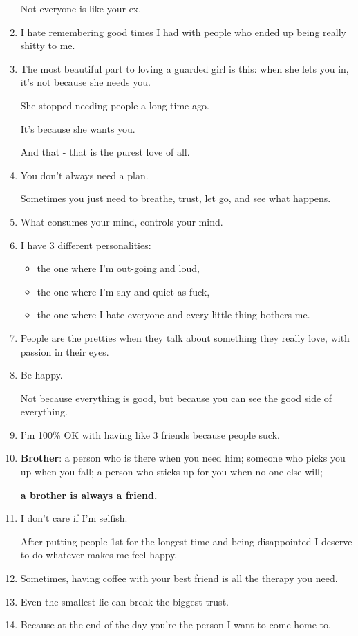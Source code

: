 \documentclass{article}
\begin{document}
\begin{enumerate}
	Not everyone is like your ex.
	\item I hate remembering good times I had with people who ended up being really shitty to me.
	\item The most beautiful part to loving a guarded girl is this: when she lets you in, it's not because she needs you.
	
	She stopped needing people a long time ago.
	
	It's because she wants you.
	
	And that - that is the purest love of all.
	\item You don't always need a plan.
	
	Sometimes you just need to breathe, trust, let go, and see what happens.
	\item What consumes your mind, controls your mind.
	\item I have 3 different personalities:
	\begin{itemize}
		\item the one where I'm out-going and loud,
		\item the one where I'm shy and quiet as fuck,
		\item the one where I hate everyone and every little thing bothers me.
	\end{itemize}
	\item People are the pretties when they talk about something they really love, with passion in their eyes.
	\item Be happy.
	
	Not because everything is good, but because you can see the good side of everything.
	\item I'm 100\% OK with having like 3 friends because people suck.
	\item \textbf{Brother}: a person who is there when you need him; someone who picks you up when you fall; a person who sticks up for you when no one else will;
	
	\textbf{a brother is always a friend.}
	\item I don't care if I'm selfish.
	
	After putting people 1st for the longest time and being disappointed I deserve to do whatever makes me feel happy.
	\item Sometimes, having coffee with your best friend is all the therapy you need.
	\item Even the smallest lie can break the biggest trust.
	\item Because at the end of the day you're the person I want to come home to.
	

\end{enumerate}
\end{document}
